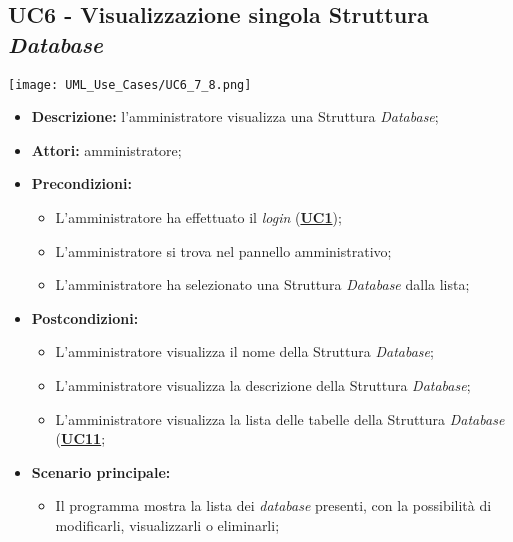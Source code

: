 \subsection{UC6 - Visualizzazione singola Struttura \textit{Database}}
\label{sec:UC6}
\texttt{[image: UML\_Use\_Cases/UC6\_7\_8.png]}
\begin{itemize}
	\item \textbf{Descrizione:} l’amministratore visualizza una Struttura \textit{Database};
	\item \textbf{Attori:} amministratore;
	\item \textbf{Precondizioni:} 
	\begin{itemize}
		\item L’amministratore ha effettuato il \textit{login} (\hyperref[sec:UC1]{\textbf{UC1}});
		\item L’amministratore si trova nel pannello amministrativo;
		\item L'amministratore ha selezionato una Struttura \textit{Database} dalla lista;
	\end{itemize}
	\item \textbf{Postcondizioni:} 
	\begin{itemize}
		\item L'amministratore visualizza il nome della Struttura \textit{Database};
		\item L'amministratore visualizza la descrizione della Struttura \textit{Database};
		\item L'amministratore visualizza la lista delle tabelle della Struttura \textit{Database}  (\hyperref[sec:UC11]{\textbf{UC11}};
	\end{itemize}
	\item \textbf{Scenario principale:} 
	\begin{itemize}
		\item Il programma mostra la lista dei \textit{database} presenti, con la possibilità di modificarli, visualizzarli o eliminarli;
	\end{itemize}
\end{itemize}


